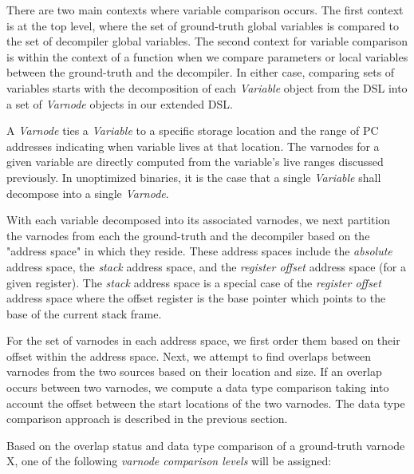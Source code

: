 There are two main contexts where variable comparison occurs. The first context is at the top level, where the set of ground-truth global variables is compared to the set of decompiler global variables. The second context for variable comparison is within the context of a function when we compare parameters or local variables between the ground-truth and the decompiler. In either case, comparing sets of variables starts with the decomposition of each \emph{Variable} object from the DSL into a set of \emph{Varnode} objects in our extended DSL.

A \emph{Varnode} ties a \emph{Variable} to a specific storage location and the range of PC addresses indicating when variable lives at that location. The varnodes for a given variable are directly computed from the variable's live ranges discussed previously. In unoptimized binaries, it is the case that a single \emph{Variable} shall decompose into a single \emph{Varnode}.

With each variable decomposed into its associated varnodes, we next partition the varnodes from each the ground-truth and the decompiler based on the "address space" in which they reside. These address spaces include the \emph{absolute} address space, the \emph{stack} address space, and the \emph{register offset} address space (for a given register). The \emph{stack} address space is a special case of the \emph{register offset} address space where the offset register is the base pointer which points to the base of the current stack frame.

For the set of varnodes in each address space, we first order them based on their offset within the address space. Next, we attempt to find overlaps between varnodes from the two sources based on their location and size. If an overlap occurs between two varnodes, we compute a data type comparison taking into account the offset between the start locations of the two varnodes. The data type comparison approach is described in the previous section.

Based on the overlap status and data type comparison of a ground-truth varnode X, one of the following \emph{varnode comparison levels} will be assigned:

